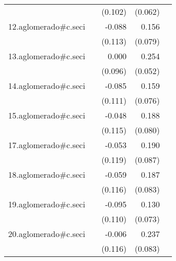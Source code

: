 {\begin{longtable}{l*{4}{D{.}{.}{-1}}}
            &                     &     (0.102)         &     (0.062)         &                     \\
\addlinespace
12.aglomerado#c.seci&                     &      -0.088         &       0.156\sym{*}  &                     \\
            &                     &     (0.113)         &     (0.079)         &                     \\
\addlinespace
13.aglomerado#c.seci&                     &       0.000         &       0.254\sym{***}&                     \\
            &                     &     (0.096)         &     (0.052)         &                     \\
\addlinespace
14.aglomerado#c.seci&                     &      -0.085         &       0.159\sym{*}  &                     \\
            &                     &     (0.111)         &     (0.076)         &                     \\
\addlinespace
15.aglomerado#c.seci&                     &      -0.048         &       0.188\sym{*}  &                     \\
            &                     &     (0.115)         &     (0.080)         &                     \\
\addlinespace
17.aglomerado#c.seci&                     &      -0.053         &       0.190\sym{*}  &                     \\
            &                     &     (0.119)         &     (0.087)         &                     \\
\addlinespace
18.aglomerado#c.seci&                     &      -0.059         &       0.187\sym{*}  &                     \\
            &                     &     (0.116)         &     (0.083)         &                     \\
\addlinespace
19.aglomerado#c.seci&                     &      -0.095         &       0.130         &                     \\
            &                     &     (0.110)         &     (0.073)         &                     \\
\addlinespace
20.aglomerado#c.seci&                     &      -0.006         &       0.237\sym{**} &                     \\
            &                     &     (0.116)         &     (0.083)         &                     \\

\end{longtable}}
